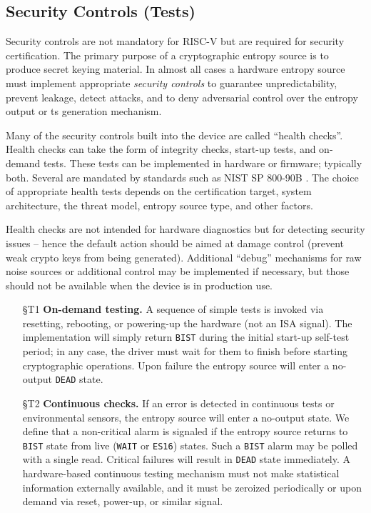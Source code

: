 {\begin{itemize}
    \end{itemize}



\subsection{Security Controls (Tests)}
\label{sec:security-controls}

    Security controls are not mandatory for RISC-V but are required for
    security certification.
    The primary purpose of a cryptographic entropy source is to produce
    secret keying material. In almost all cases a hardware entropy source
    must implement appropriate \emph{security controls} to guarantee
    unpredictability, prevent leakage, detect attacks, and to deny
    adversarial control over the entropy output or ts generation mechanism.

    Many of the security controls built into the device are called ``health
    checks''. Health checks can take the form of
    integrity checks, start-up tests, and on-demand tests. These tests can
    be implemented in hardware or firmware; typically both. Several are
    mandated by standards such as NIST SP 800-90B \cite{NI19}. The choice
    of appropriate health tests depends on the certification target,
    system architecture, the threat model, entropy source type, and other
    factors.

    Health checks are not intended for hardware diagnostics but for
    detecting security issues -- hence the default action should be aimed
    at damage control (prevent weak crypto keys from being
    generated). Additional ``debug'' mechanisms for raw noise sources
    or additional control may be implemented if necessary, but those should
    not be available when the device is in production use.

    \begin{itemize}

    \item[\S T1]    {\bf On-demand testing.}
    A sequence of simple tests is invoked via resetting, rebooting, or
    powering-up the hardware (not an ISA signal). The implementation will
    simply return  \verb|BIST| during the initial start-up self-test period;
    in any case, the driver must wait for them to finish before starting
    cryptographic operations. Upon failure the entropy source will enter a
    no-output \verb|DEAD| state.

    \item[\S T2]    {\bf Continuous checks.}
    If an error is detected in continuous tests or environmental sensors,
    the entropy source will enter a no-output state. We define that a
  	non-critical alarm is signaled if the entropy source returns
    to \verb|BIST| state from live (\verb|WAIT| or \verb|ES16|) states.
    Such a \verb|BIST| alarm may be polled with a single read.
    Critical failures will result in \verb|DEAD| state immediately.
    A hardware-based continuous testing mechanism must not make statistical
    information externally available, and it must be zeroized periodically or
    upon demand via reset, power-up, or similar signal.


\end{itemize}}
